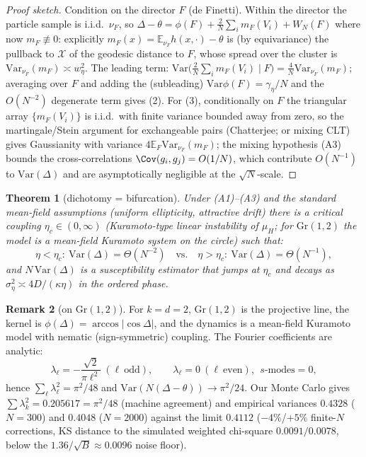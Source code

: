 \documentclass[11pt]{article}
\newtheorem{theorem}{Theorem}
\theoremstyle{definition}
\newtheorem{remark}[theorem]{Remark}
\newcommand{\Gr}{\mathrm{Gr}}
\newcommand{\E}{\mathbb{E}}
\newcommand{\Var}{\mathrm{Var}}
\newcommand{\cX}{\mathcal{X}}
\begin{document}
\begin{proof}[Proof sketch]
Condition on the director $F$ (de Finetti). Within the director the particle sample
is i.i.d.\ $\nu_F$, so
$\Delta-\theta=\phi(F)+\frac2N\sum_i m_F(V_i)+W_N(F)$ where now
$m_F\not\equiv0$: explicitly $m_F(x)=\E_{\nu_F}h(x,\cdot)-\theta$ is (by
equivariance) the pullback to $\cX$ of the geodesic distance to $F$, whose spread
over the cluster is $\Var_{\nu_F}(m_F)\asymp w_\eta^2$. The leading term:
$\Var\bigl(\frac2N\sum_i m_F(V_i)\mid F\bigr)=\frac4N\Var_{\nu_F}(m_F)$; averaging
over $F$ and adding the (subleading) $\Var\phi(F)=\gamma_\eta/N$ and the
$O(N^{-2})$ degenerate term gives (2). For (3), conditionally on $F$ the triangular
array $\{m_F(V_i)\}$ is i.i.d.\ with finite variance bounded away from zero, so the
martingale/Stein argument for exchangeable pairs (Chatterjee; or mixing CLT) gives
Gaussianity with variance $4\E_F\Var_{\nu_F}(m_F)$; the mixing hypothesis (A3) bounds
the cross-correlations $\Cov(g_i,g_j)=O(1/N)$, which contribute $O(N^{-1})$ to
$\Var(\Delta)$ and are asymptotically negligible at the $\sqrt N$-scale.
\end{proof}

\begin{theorem}[dichotomy = bifurcation]
\label{thm:dich}
Under (A1)--(A3) and the standard mean-field assumptions (uniform ellipticity,
attractive drift) there is a critical coupling $\eta_c\in(0,\infty)$
(Kuramoto-type linear instability of $\mu_H$; for $\Gr(1,2)$ the model is a mean-field
Kuramoto system on the circle) such that:
\[
\eta<\eta_c:\ \Var(\Delta)=\Theta(N^{-2}) \quad\text{vs.}\quad
\eta>\eta_c:\ \Var(\Delta)=\Theta(N^{-1}),
\]
and $N\,\Var(\Delta)$ is a susceptibility estimator that jumps at $\eta_c$ and decays
as $\sigma_\eta^2\asymp 4D/(\kappa\eta)$ in the ordered phase.
\end{theorem}

\begin{remark}[on $\Gr(1,2)$]
For $k=d=2$, $\Gr(1,2)$ is the projective line, the kernel is
$\phi(\Delta)=\arccos|\cos\Delta|$, and the dynamics is a mean-field Kuramoto model
with nematic (sign-symmetric) coupling. The Fourier coefficients are analytic:
\[
\lambda_\ell=-\frac{\sqrt2}{\pi\ell^2}\ (\ell\ \text{odd}),\qquad
\lambda_\ell=0\ (\ell\ \text{even}),\ \ s\text{-modes}=0,
\]
hence $\sum_\ell\lambda_\ell^2=\pi^2/48$ and
$\Var(N(\Delta-\theta))\to\pi^2/24$.
Our Monte Carlo gives $\sum\lambda_k^2=0.205617=\pi^2/48$ (machine agreement) and
empirical variances $0.4328$ ($N=300$) and $0.4048$ ($N=2000$) against the limit
$0.4112$ ($-4\%$/$+5\%$ finite-$N$ corrections, KS distance to the simulated weighted
chi-square $0.0091/0.0078$, below the $1.36/\sqrt{B}\approx0.0096$ noise floor).
\end{remark}
\end{document}
